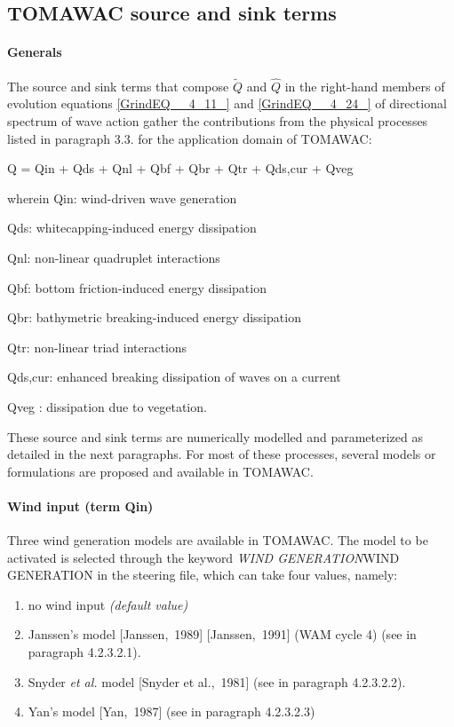 \subsection{ TOMAWAC source and sink terms}


\paragraph{ Generals}

 The source and sink terms that compose $\tilde{Q}$ and $\hat{Q}$ in the right-hand members of evolution equations \eqref{GrindEQ__4_11_} and \eqref{GrindEQ__4_24_} of directional spectrum of wave action gather the contributions from the physical processes listed in paragraph 3.3. for the application domain of TOMAWAC:

 Q = Qin + Qds + Qnl + Qbf + Qbr + Qtr + Qds,cur + Qveg

 wherein Qin: wind-driven wave generation

 Qds: whitecapping-induced energy dissipation

 Qnl: non-linear quadruplet interactions

 Qbf: bottom friction-induced energy dissipation

 Qbr: bathymetric breaking-induced energy dissipation

 Qtr: non-linear triad interactions

 Qds,cur: enhanced breaking dissipation of waves on a current

 Qveg : dissipation due to vegetation.

These source and sink terms are numerically modelled and parameterized as detailed in the next paragraphs. For most of these processes, several models or formulations are proposed and available in TOMAWAC.


\paragraph{ Wind input (term Qin)}

 Three wind generation models are available in TOMAWAC. The model to be activated is selected through the keyword \textit{WIND GENERATION}WIND GENERATION\textit{ }in the steering file, which can take four values, namely:

\begin{enumerate}
\item  no wind input \textit{(default value)}

\item  Janssen's model [Janssen,~1989] [Janssen,~1991] (WAM cycle 4) (see in paragraph 4.2.3.2.1).

\item  Snyder \textit{et al. }model [Snyder et al.,~1981] (see in paragraph 4.2.3.2.2).

\item  Yan's model [Yan,~1987] (see in paragraph 4.2.3.2.3)
\end{enumerate}


